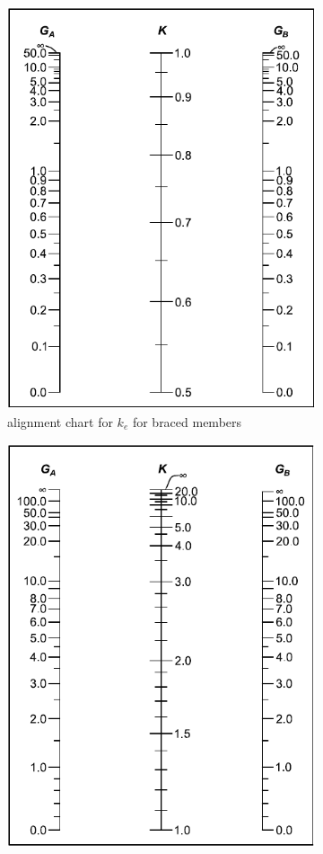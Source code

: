 \begin{figure}
\centering\footnotesize
\begin{subfigure}{.5\linewidth}\centering
\includegraphics[width=.9\linewidth]{PIC/CH04/A360.BRACED}
\caption{alignment chart for $k_e$ for braced members}
\end{subfigure}\hfil
\begin{subfigure}{.5\linewidth}\centering
\includegraphics[width=.9\linewidth]{PIC/CH04/A360.SWAY}

\end{subfigure}
\end{figure}
